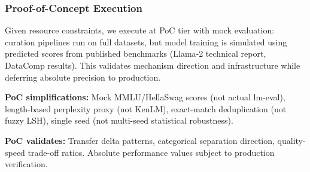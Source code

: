 \subsubsection{Proof-of-Concept Execution}

Given resource constraints, we execute at PoC tier with mock evaluation: curation pipelines run on full datasets, but model training is simulated using predicted scores from published benchmarks (Llama-2 technical report, DataComp results). This validates mechanism direction and infrastructure while deferring absolute precision to production.

\textbf{PoC simplifications:} Mock MMLU/HellaSwag scores (not actual lm-eval), length-based perplexity proxy (not KenLM), exact-match deduplication (not fuzzy LSH), single seed (not multi-seed statistical robustness).

\textbf{PoC validates:} Transfer delta patterns, categorical separation direction, quality-speed trade-off ratios. Absolute performance values subject to production verification.
